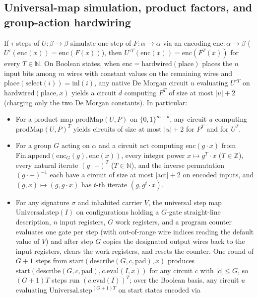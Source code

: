 \begin{result}
\subsection{Universal-map simulation, product factors, and group-action hardwiring}
If $\tau$ steps of $U:\beta\to\beta$ simulate one step of $F:\alpha\to\alpha$ via an encoding
$\mathrm{enc}:\alpha\to\beta$ ($U^\tau(\mathrm{enc}(x))=\mathrm{enc}(F(x))$), then
$U^{\tau T}(\mathrm{enc}(x))=\mathrm{enc}(F^T(x))$ for every $T\in\mathbb N$. On Boolean states,
when $\mathrm{enc}=\mathrm{hardwired}(\mathrm{place})$ places the $n$ input bits among $m$ wires
with constant values on the remaining wires and $\mathrm{place}(\mathrm{select}(i))=\mathrm{inl}(i)$,
any native De Morgan circuit $u$ evaluating $U^{\tau T}$ on $\mathrm{hardwired}(\mathrm{place},x)$
yields a circuit $d$ computing $F^T$ of size at most $|u|+2$ (charging only the two De Morgan
constants). In particular:
\begin{itemize}
\item For a product map $\mathrm{prodMap}(U,P)$ on $\{0,1\}^{m+k}$, any circuit $u$ computing
$\mathrm{prodMap}(U,P)^T$ yields circuits of size at most $|u|+2$ for $P^T$ and for $U^T$.
\item For a group $G$ acting on $\alpha$ and a circuit $\mathrm{act}$ computing
$\mathrm{enc}(g\cdot x)$ from $\mathrm{Fin.append}(\mathrm{enc}_G(g),\mathrm{enc}(x))$, every
integer power $x\mapsto g^T\cdot x$ ($T\in\mathbb Z$), every natural iterate $(g\cdot -)^T$
($T\in\mathbb N$), and the inverse permutation $(g\cdot -)^{-1}$ each have a circuit of size at
most $|\mathrm{act}|+2$ on encoded inputs, and $(g,x)\mapsto(g,g\cdot x)$ has $t$-th iterate
$(g,g^t\cdot x)$.
\item For any signature $\sigma$ and inhabited carrier $V$, the universal step map
$\mathrm{Universal.step}(I)$ on configurations holding a $G$-gate straight-line description, $n$
input registers, $G$ work registers, and a program counter evaluates one gate per step (with
out-of-range wire indices reading the default value of $V$) and after step
$G$ copies the designated output wires back to the input registers, clears the work registers, and
resets the counter. One round of $G+1$ steps from $\mathrm{start}(\mathrm{describe}(G,c,\mathrm{pad}),x)$
produces $\mathrm{start}(\mathrm{describe}(G,c,\mathrm{pad}),c.\mathrm{eval}(I,x))$ for any circuit
$c$ with $|c|\le G$, so $(G+1)T$ steps run $(c.\mathrm{eval}(I))^T$; over the Boolean basis, any
circuit $u$ evaluating $\mathrm{Universal.step}^{(G+1)T}$ on start states encoded via

\end{itemize}
\end{result}
